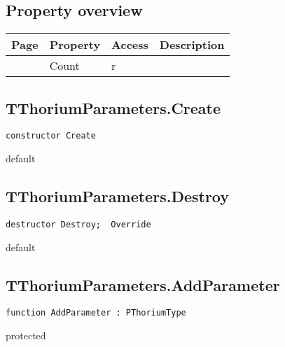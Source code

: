 \subsection{Property overview}
\label{thoriumcore:thorium:tthoriumparameters:properties}
\begin{tabularx}{\textwidth}{lllX}
Page & Property & Access & Description \\ \hline
\pageref{thoriumcore:thorium:tthoriumparameters:count} & Count & r &  \\
\hline
\end{tabularx}
\subsection{TThoriumParameters.Create}
\label{thoriumcore:thorium:tthoriumparameters:create}
\begin{FPCList}
\Synopsis
\Declaration 

\begin{verbatim}
constructor Create
\end{verbatim}
\Visibility
default
\Description
\Errors
\end{FPCList}
\subsection{TThoriumParameters.Destroy}
\label{thoriumcore:thorium:tthoriumparameters:destroy}
\begin{FPCList}
\Synopsis
\Declaration 

\begin{verbatim}
destructor Destroy;  Override
\end{verbatim}
\Visibility
default
\Description
\Errors
\end{FPCList}
\subsection{TThoriumParameters.AddParameter}
\label{thoriumcore:thorium:tthoriumparameters:addparameter}
\begin{FPCList}
\Synopsis
\Declaration 

\begin{verbatim}
function AddParameter : PThoriumType
\end{verbatim}
\Visibility
protected
\Description
\Errors
\end{FPCList}
